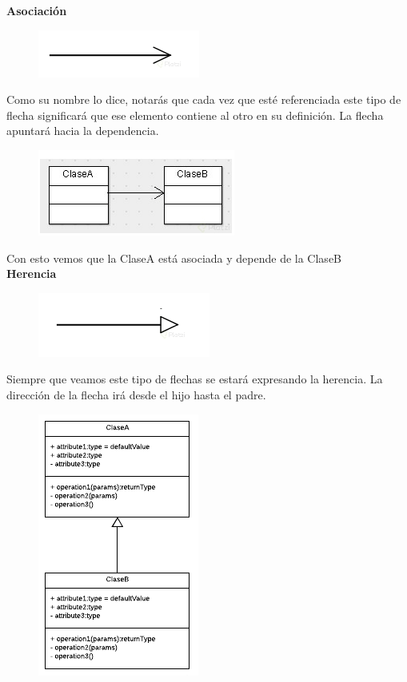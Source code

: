 \documentclass{article}
\begin{document}
\textbf{Asociación}\\

\begin{figure}[h!]
  \centering
  \includegraphics[scale=0.75]{./Pictures/003_asociacion.png}
\end{figure}

Como su nombre lo dice, notarás que cada vez que esté referenciada este tipo de
flecha significará que ese elemento contiene al otro en su definición. La flecha
apuntará hacia la dependencia.

\begin{figure}[h!]
  \centering
  \includegraphics[scale=0.75]{./Pictures/004_asociacion.png}
\end{figure}

Con esto vemos que la ClaseA está asociada y depende de la ClaseB\\

\textbf{Herencia}\\

\begin{figure}[h!]
  \centering
  \includegraphics[scale=0.75]{./Pictures/005_herencia.png}
\end{figure}

Siempre que veamos este tipo de flechas se estará expresando la herencia. La
dirección de la flecha irá desde el hijo hasta el padre.\\

\begin{figure}[h!]
  \centering
  \includegraphics[scale=0.75]{./Pictures/006_herencia.png}
\end{figure}
\end{document}
